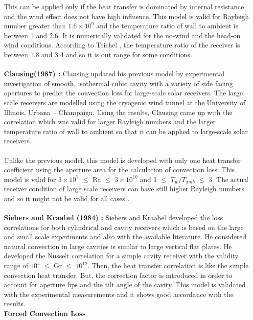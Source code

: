 This can be applied only if the heat transfer is dominated by internal resistance and the wind effect does not have high influence. This model is valid for Rayleigh number greater than $1.6 \times 10^9$ and the temperature ratio of wall to ambient is between 1 and 2.6. It is numerically validated for the no-wind and the head-on wind conditions. According to Teichel \cite{Teichel.2011}, the temperature ratio of the receiver is between 1.8 and 3.4 and so it is out range for some conditions. \\\\
\textbf{Clausing(1987) \cite{Clausing.1987}:}
Clausing updated his previous model by experimental investigation of smooth, isothermal cubic cavity with a variety of side facing apertures to predict the convection loss for large-scale solar receivers. The large scale receivers are modelled using the cryogenic wind tunnel at the University of Illinois, Urbana – Champaign. Using the results, Clausing came up with the correlation which was valid for larger Rayleigh numbers and the larger temperature ratio of wall to ambient so that it can be applied to large-scale solar receivers. \\\\
Unlike the previous model, this model is developed with only one heat transfer coefficient using the aperture area for the calculation of convection loss. This model is valid for $3 \times 10^7$ $\le$ Ra $\le$ $ 3 \times 10^{10}$ and 1 $\le$ $T_w/T_{amb}$ $\le$ 3. The actual receiver condition of large scale receivers can have still higher Rayleigh numbers and so it might not be valid for all cases \cite{Teichel.2011}.\\\\
\textbf{Siebers and Kraabel (1984) \cite{Siebers.1984}:}
Siebers and Kraabel developed the loss correlations for both cylindrical and cavity receivers which is based on the large and small scale experiments and also with the available literature. He considered natural convection in large cavities is similar to large vertical flat plates.  He developed the Nusselt correlation for a simple cavity receiver with the validity range of $10^5$ $\le$ Gr $\le$ $10^{12}$. Then, the heat transfer correlation is like the simple convection heat transfer. But, the correction factor is introduced in order to account for aperture lips and the tilt angle of the cavity. This model is validated with the experimental measurements and it shows good accordance with the results.\\
\textbf{Forced Convection Loss}\\[0.25 cm]
